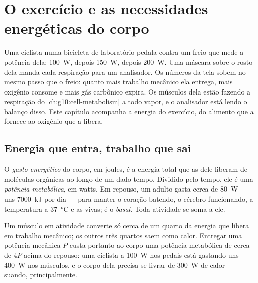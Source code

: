\chapter{O exercício e as necessidades energéticas do corpo}\label{ch:g10:exercise-and-energy}

Uma ciclista numa bicicleta de laboratório pedala contra um freio que
mede a potência dela: \qty{100}{W}, depois \qty{150}{W}, depois
\qty{200}{W}. Uma máscara sobre o rosto dela manda cada respiração para
um analisador. Os números da tela sobem no mesmo passo que o freio:
quanto mais trabalho mecânico ela entrega, mais oxigênio consome e mais
gás carbônico expira. Os músculos dela estão fazendo a respiração do
\cref{ch:g10:cell-metabolism} a todo vapor, e o analisador está lendo o
balanço disso. Este capítulo acompanha a energia do exercício, do
alimento que a fornece ao oxigênio que a libera.

\section{Energia que entra, trabalho que sai}

\begin{definition}\label{def:g10:exercise-and-energy:expenditure}
O \emph{gasto energético} do corpo, em joules,
é a energia total que as  dele liberam de moléculas orgânicas ao
longo de um dado tempo. Dividido pelo tempo, ele é uma
\emph{potência metabólica}, em watts. Em repouso, um adulto gasta cerca
de \qty{80}{W} --- uns \qty{7000}{kJ} por dia --- para manter o coração
batendo, o cérebro funcionando, a temperatura a \qty{37}{\celsius} e as
 vivas; é o \emph{ basal}. Toda atividade se soma a
ele.
\end{definition}

\begin{proposition}\label{prop:g10:exercise-and-energy:efficiency}
Um músculo em atividade converte só cerca de um quarto da energia que
libera em trabalho mecânico; os outros três quartos saem como calor.
Entregar uma potência mecânica $P$ custa portanto ao corpo uma
potência metabólica de cerca de $4P$ acima do repouso: uma ciclista a
\qty{100}{W} nos pedais está gastando uns \qty{400}{W} nos músculos, e
o corpo dela precisa se livrar de \qty{300}{W} de calor --- suando,
principalmente.
\end{proposition}
\admitted

